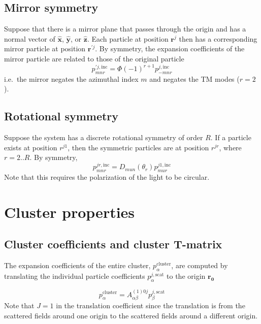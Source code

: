\documentclass[11pt]{article}
\begin{document}
\subsection{Mirror symmetry}
Suppose that there is a mirror plane that passes through the origin and has a normal vector of $\bm{\hat x}$, $\bm{\hat y}$, or $\bm{\hat z}$.
Each particle at position $\bm{r}^j$ then has a corresponding mirror particle at position $\bm{r}^{\prime j}$.
By symmetry, the expansion coefficients of the mirror particle are related to those of the original particle
\begin{equation}
    p^{\prime j,\text{inc}}_{mnr} = \Phi (-1)^{r+1} p^{j,\text{inc}}_{-mnr}
    \label{eqn:mirror_symmetry}
\end{equation}
i.e.\ the mirror negates the azimuthal index $m$ and negates the TM modes ($r=2$).

\subsection{Rotational symmetry}
Suppose the system has a discrete rotational symmetry of order $R$.
If a particle exists at position $r^{j1}$, then the symmetric particles are at position $r^{jr}$, where $r = 2..R$.
By symmetry,
\begin{equation}
    p^{jr,\text{inc}}_{mnr} = D_{mun}(\theta_r) p^{j1,\text{inc}}_{mur}
    \label{eqn:rotational_symmetry}
\end{equation}
Note that this requires the polarization of the light to be circular.

\section{Cluster properties}

\subsection{Cluster coefficients and cluster T-matrix}
The expansion coefficients of the entire cluster, $p_{\alpha}^{\text{cluster}}$, are computed by translating the individual particle coefficients $p_{\alpha}^{j,\text{scat}}$ to the origin $\bm{r_0}$

\begin{equation}
    p_{\alpha}^{\text{cluster}} = 
    A_{\alpha \beta}^{(1)0j}
    p_{\beta}^{j,\text{scat}}
\label{eqn:cluster_coefficients}
\end{equation}
Note that $J=1$ in the translation coefficient since the translation is from the scattered fields around one origin to the scattered fields around a different origin.
\end{document}
